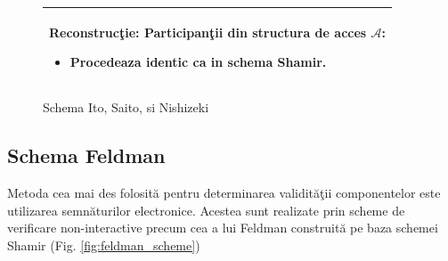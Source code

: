 \documentclass{llncs}
\begin{document}
\begin{figure}[h!]
\begin{tabular}{|p{\textwidth}|}
\hspace{.1in}
\textbf{Reconstruc\c{t}ie}: Participan\c{t}ii din structura de acces $\mathcal{A}$:
	\begin{itemize}
		\item Procedeaza identic ca in schema Shamir.
	\end{itemize}


\\
\hline
\end{tabular}

\caption{Schema Ito, Saito, si Nishizeki \cite{ITO:1989}}
\label{fig:ito_et_al}
\end{figure}



\subsection{Schema Feldman}
\label{sec:feldman_scheme}
Metoda cea mai des folosit\u{a} pentru determinarea validit\u{a}\c{t}ii componentelor este utilizarea semn\u{a}turilor electronice. Acestea sunt realizate prin scheme de verificare non-interactive precum cea a lui Feldman construit\u{a} pe baza schemei Shamir \cite{Feldman:1987} (Fig. \ref{fig:feldman_scheme})
\end{document}
